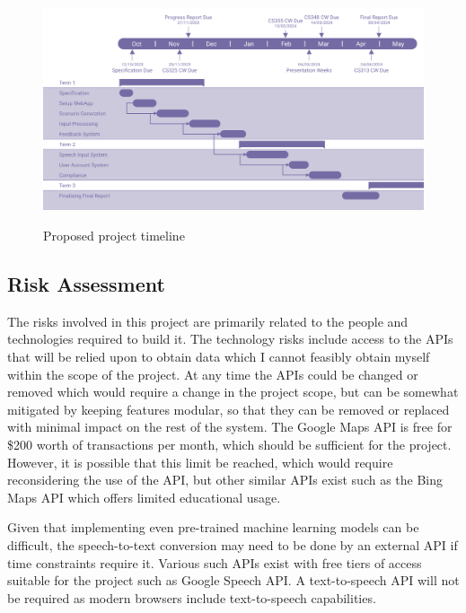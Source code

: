 \begin{figure}[H]
    \centering
	\includegraphics[scale = 0.42]{../document-resources/images/initial-gantt.png}
    \label{initialgantt}
    \caption{Proposed project timeline}
\end{figure}

\subsection{Risk Assessment}
The risks involved in this project are primarily related to the people and technologies required to build it.
The technology risks include access to the APIs that will be relied upon to obtain data which I cannot feasibly obtain myself within the scope of the project.
At any time the APIs could be changed or removed which would require a change in the project scope, but can be somewhat mitigated by keeping features modular, so that they can be removed or replaced with minimal impact on the rest of the system.
The Google Maps API is free for \$200 worth of transactions per month, which should be sufficient for the project. However, it is possible that this limit be reached, which would require reconsidering the use of the API, but other similar APIs exist such as the Bing Maps API which offers limited educational usage.

Given that implementing even pre-trained machine learning models can be difficult, the speech-to-text conversion may need to be done by an external API if time constraints require it. Various such APIs exist with free tiers of access suitable for the project such as Google Speech API. A text-to-speech API will not be required as modern browsers include text-to-speech capabilities.

